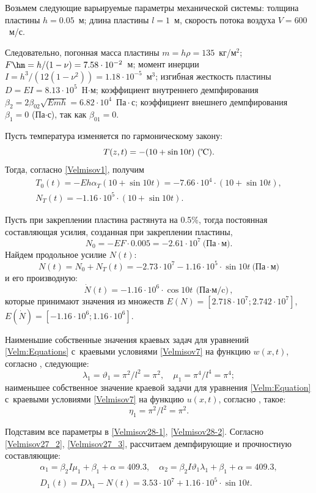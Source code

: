 Возьмем следующие варьируемые параметры механической системы:  толщина пластины $h=0.05$~м; длина пластины $l=1$~м, скорость потока воздуха $V=600$~м/с. 

Следовательно,  погонная масса пластины $m=h\rho=135 $~кг/м$^2$; 
$F\hm =h/{(1-\nu)} =7.58 \cdot 10^{-2}$~м; 
момент инерции  $I=h^{3} /(12(1-\nu ^{2} ))=1.18 \cdot 10^{-5} $~м$^3$; 
изгибная жесткость пластины $D=EI=8.13 \cdot 10^{5}$~H$\cdot$м;  
коэффициент внутреннего демпфирования $\beta _{2}=2\beta _{02}\sqrt{Emh}=6.82\cdot 10^4$~Па${}\cdot{}$с; 
коэффициент внешнего демпфирования $\beta _{1}=0$ (Па$\cdot$с), так как $\beta _{01}=0$.   
  
Пусть температура изменяется по гармоническому закону:
\[
T (z, t)=-(10+\sin 10t)~(\text{\textcelsius}).
\]
Тогда, согласно \eqref{Velmisov1}, получим 
$$
\begin{array}{l}
T_{0} (t)=-Eh\alpha _{T} (10+\sin 10t)=-7.66  \cdot 10^4 \cdot (10+\sin 10t),
\\[2mm]
N_{T} (t)=-1.16 \cdot 10^5 \cdot (10+\sin 10t) . 
\end{array}
$$

Пусть при закреплении пластина растянута на 0.5\%, тогда постоянная составляющая усилия, созданная при закреплении пластины, 
\[
N_{0} =-EF\cdot 0.005=-2.61\cdot 10^{7}~\text{(Па}{}\cdot{}\text{м)}.
\] 
Найдем продольное усилие $N(t)$: 
\[
N(t)=N_{0} +N_{T} (t)=-2.73\cdot 10^7-1.16\cdot 10^5 \cdot \sin 10t~\text{(Па}\cdot\text{м)} 
\]
и его производную:
$$
\dot N(t)=-1.16\cdot 10^6 \cdot \cos 10t ~ \text{(Па${}\cdot{}$м/c)},
$$
которые принимают значения из множеств 
$E(N) = [2.718\cdot 10^7; 2.742\cdot 10^7]$, 
$E(\dot N) = [-1.16\cdot 10^6; 1.16\cdot 10^6]$.

Наименьшие  собственные значения краевых задач для уравнений \eqref{Velm:Equations} 
с~краевыми условиями \eqref{Velmisov7} на функцию $w(x,t)$,  согласно   \cite{Ankilov1}, следующие:
$$
\lambda _{1} =\vartheta _{1}={\displaystyle\pi^2}/{\displaystyle l^2}=\pi^2,
\quad  
\mu_{1}={\displaystyle\pi^4}/{\displaystyle l^4}=\pi^4;
$$ 
наименьшее собственное значение краевой задачи для уравнения 
\eqref{Velm:Equation}
с~краевыми условиями \eqref{Velmisov7} на функцию $u(x,t)$, согласно   \cite{Ankilov1}, такое: 
$$
\eta _{1}={\displaystyle\pi^2}/{\displaystyle l^2}=\pi^2 .
$$

Подставим все параметры в \eqref{Velmisov28-1}, \eqref{Velmisov28-2}. 
Согласно \eqref{Velmisov27_2}, \eqref{Velmisov27_3}, рассчитаем  демпфирующие и прочностную составляющие: 
\begin{gather*}
\alpha_1=\beta _{2}I \mu _{1} +\beta _{1} +\alpha=409.3,\quad\alpha_2=\beta _{2}I \vartheta _{1} \lambda _{1}  +\beta _{1} +\alpha=409.3,
\\
D_1(t)=D\lambda _{1} -N(t)=3.53\cdot 10^7+1.16\cdot 10^5\cdot \sin 10t. 
\end{gather*}

